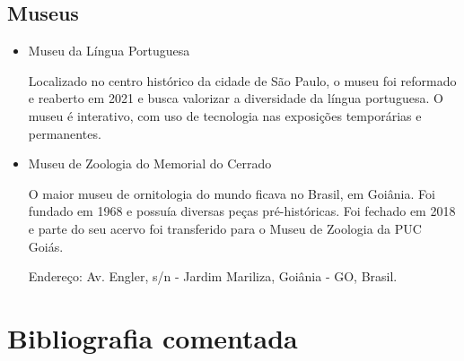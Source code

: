 \documentclass[11pt]{extarticle}
\begin{document}
\subsection{Museus}

\begin{itemize}

\item Museu da Língua Portuguesa

Localizado no centro histórico da cidade de São Paulo, o museu foi reformado e reaberto em 2021 e busca valorizar a diversidade da língua portuguesa. O museu é interativo, com uso de tecnologia nas exposições temporárias e permanentes.

\item Museu de Zoologia do Memorial do Cerrado

O maior museu de ornitologia do mundo ficava no Brasil, em Goiânia. Foi fundado em 1968 e possuía diversas peças pré-históricas. Foi fechado em 2018 e parte do seu acervo foi transferido para o Museu de Zoologia da PUC Goiás.

Endereço: Av. Engler, s/n - Jardim Mariliza, Goiânia - GO, Brasil.

\end{itemize}

\section{Bibliografia comentada}
\end{document}
